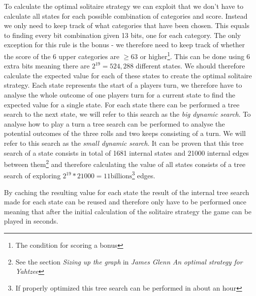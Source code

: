 To calculate the optimal solitaire strategy we can exploit that we don't have to calculate all states for each possible combination of categories and score. Instead we only need to keep track of what categories that have been chosen. This equals to finding every bit combination given 13 bits, one for each category. The only exception for this rule is the bonus - we therefore need to keep track of whether the score of the 6 upper categories are $\geq 63$ or higher\footnote{The condition for scoring a bonus}. This can be done using 6 extra bits meaning there are $2^{19} = 524,288$ different states. We should therefore calculate the expected value for each of these states to create the optimal solitaire strategy.
Each state represents the start of a players turn, we therefore have to analyse the whole outcome of one players turn for a current state to find the expected value for a single state. For each state there can be performed a tree search to the next state, we will refer to this search as the \emph{big dynamic search}. To analyse how to play a turn a tree search can be performed to analyse the potential outcomes of the three rolls and two keeps consisting of a turn. We will refer to this search as the \emph{small dynamic search}. It can be proven that this tree search of a state consists in total of 1681 internal states and 21000 internal edges between them\footnote{See the section \emph{Sizing up the graph} in \emph{James Glenn An optimal strategy for Yahtzee}\cite{glenn2006optimal}} and therefore calculating the value of all states consists of a tree search of exploring $2^{19} * 21000 = 11\mbox{billions}$\footnote{If properly optimized this tree search can be performed in about an hour} edges. 

By caching the resulting value for each state the result of the internal tree search made for each state can be reused and therefore only have to be performed once meaning that after the initial calculation of the solitaire strategy the game can be played in seconds.